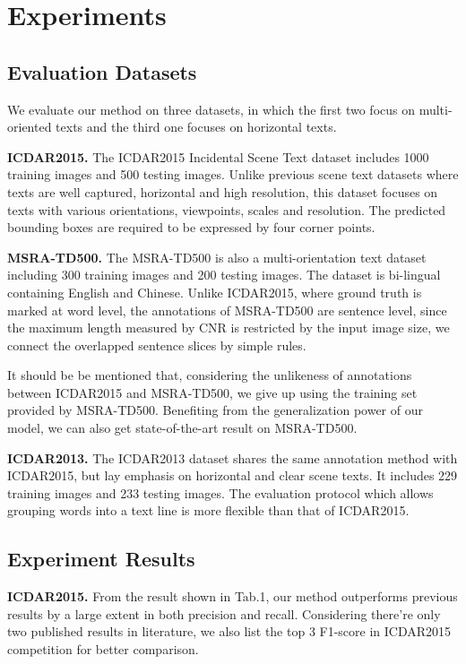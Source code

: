\documentclass[10pt,twocolumn,letterpaper]{article}
\begin{document}
\section{Experiments}
	\subsection{Evaluation Datasets}
	We evaluate our method on three datasets, in which the first two focus on multi-oriented texts and the third one focuses on horizontal texts.
	
	\noindent \textbf{ICDAR2015.} The ICDAR2015 Incidental Scene Text dataset includes 1000 training images and 500 testing images. Unlike previous scene text datasets where texts are well captured, horizontal and high resolution, this dataset focuses on texts with various orientations, viewpoints, scales and resolution. The predicted bounding boxes are required to be expressed by four corner points.
	
	\noindent \textbf{MSRA-TD500.} The MSRA-TD500 is also a multi-orientation text dataset including 300 training images and 200 testing images. The dataset is bi-lingual containing English and Chinese. Unlike ICDAR2015, where ground truth is marked at word level, the annotations of MSRA-TD500 are sentence level, since the maximum length measured by CNR is restricted by the input image size, we connect the overlapped sentence slices by simple rules. 
	
	It should be be mentioned that, considering the unlikeness of annotations between ICDAR2015 and MSRA-TD500, we give up using the training set provided by MSRA-TD500. Benefiting from the generalization power of our model, we can also get state-of-the-art result on MSRA-TD500.
	
	\noindent \textbf{ICDAR2013.} The ICDAR2013 dataset shares the same annotation method with ICDAR2015, but lay emphasis on horizontal and clear scene texts. It includes 229 training images and 233 testing images. The evaluation protocol which allows grouping words into a text line is more flexible than that of ICDAR2015.
	
	\subsection{Experiment Results}
	\noindent \textbf{ICDAR2015.} From the result shown in Tab.1, our method outperforms previous results by a large extent in both precision and recall. Considering there're only two published results in literature, we also list the top 3 F1-score in ICDAR2015 competition for better comparison.
	
\end{document}
